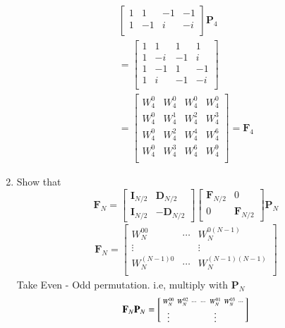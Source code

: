 \documentclass[journal,12pt,twocolumn]{IEEEtran}
\let\vec\mathbf
\renewcommand\thesection{\arabic{section}}
\begin{document}
\begin{enumerate}[label=\arabic*.,ref=\thesection.\theenumi]
\begin{align}
\begin{bmatrix}
		1	&	1	&	-1	&	-1\\
		1	&	-1	&	i	&	-i\\
	\end{bmatrix}\vec{P}_{4}\\
		=\begin{bmatrix}
			1	&	1	&	1	&	1\\
			1	&	-i	&	-1	&	i\\
			1	&	-1	&	1	&	-1\\
			1	&	i	&	-1	&	-i\\
		\end{bmatrix}\\
	= \begin{bmatrix}
		W_{4}^0	&	W_{4}^0	&	W_{4}^0	&	W_{4}^0\\
		W_{4}^0	&	W_{4}^1	&	W_{4}^2	&	W_{4}^3\\
		W_{4}^0	&	W_{4}^2	&	W_{4}^4	&	W_{4}^6\\
		W_{4}^0	&	W_{4}^3	&	W_{4}^6	&	W_{4}^9\\
	\end{bmatrix} = \vec{F}_{4}
\end{align}
\item Show that 
\begin{equation}
	\vec{F}_{N}=
	\begin{bmatrix}
		\vec{I}_{N/2} & \vec{D}_{N/2} \\
		\vec{I}_{N/2} & -\vec{D}_{N/2}
	\end{bmatrix}
	\begin{bmatrix}
		\vec{F}_{N/2} & 0 \\
		0 & \vec{F}_{N/2}
	\end{bmatrix}
	\vec{P}_{N}
\end{equation}
\solution
\begin{align}
	\vec{F}_N = \begin{bmatrix}
		W_{N}^{00}	& \cdots & W_{N}^{0(N-1)}\\
		\vdots & & \vdots\\
		W_{N}^{(N-1)0}	& \cdots & W_{N}^{(N-1)(N-1)}\\
	\end{bmatrix}
\end{align}
Take Even - Odd permutation. i.e, multiply with $\vec{P}_N$
\begin{align}
	\vec{F}_N \vec{P}_N  = \begin{bsmallmatrix}
		W_{N}^{00}	&	W_{N}^{02}	&	\cdots	&	\cdots	&	W_{N}^{01}	&	W_{N}^{03}	& \cdots\\
		\vdots	&&&&	\vdots\\

\end{bsmallmatrix}
\end{align}
\end{enumerate}
\end{document}
